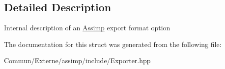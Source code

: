 \subsection{Detailed Description}
Internal description of an \hyperlink{namespace_assimp}{Assimp} export format option 

The documentation for this struct was generated from the following file\+:\begin{DoxyCompactItemize}
\item 
Commun/\+Externe/assimp/include/Exporter.\+hpp\end{DoxyCompactItemize}
